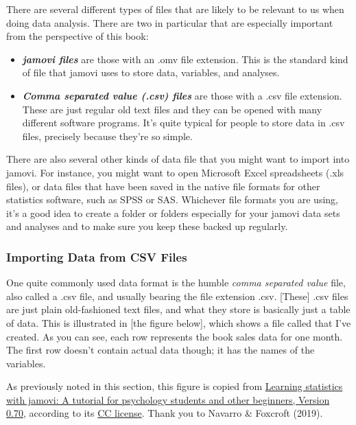 \documentclass[
]{book}
\begin{document}
There are several different types of files that are likely to be relevant to us when doing data analysis. There are two in particular that are especially important from the perspective of this book:

\begin{itemize}
\item
  \textbf{\emph{jamovi files}} are those with an .omv file extension. This is the standard kind of file that jamovi uses to store data, variables, and analyses.
\item
  \textbf{\emph{Comma separated value (.csv) files}} are those with a .csv file extension. These are just regular old text files and they can be opened with many different software programs. It's quite typical for people to store data in .csv files, precisely because they're so simple.
\end{itemize}

There are also several other kinds of data file that you might want to import into jamovi. For instance, you might want to open Microsoft Excel spreadsheets (.xls files), or data files that have been saved in the native file formats for other statistics software, such as SPSS or SAS. Whichever file formats you are using, it's a good idea to create a folder or folders especially for your jamovi data sets and analyses and to make sure you keep these backed up regularly.

\hypertarget{importing-data-from-csv-files}{%
\subsubsection{Importing Data from CSV Files}\label{importing-data-from-csv-files}}

One quite commonly used data format is the humble \emph{comma separated value} file, also called a .csv file, and usually bearing the file extension .csv. {[}These{]} .csv files are just plain old-fashioned text files, and what they store is basically just a table of data. This is illustrated in {[}the figure below{]}, which shows a file called  that I've created. As you can see, each row represents the book sales data for one month. The first row doesn't contain actual data though; it has the names of the variables.

As previously noted in this section, this figure is copied from \href{https://www.learnstatswithjamovi.com/}{Learning statistics with jamovi: A tutorial for psychology students and other beginners, Version 0.70}, according to its \href{https://creativecommons.org/licenses/by-sa/4.0/deed.ast}{CC license}. Thank you to Navarro \& Foxcroft (2019).
\end{document}
